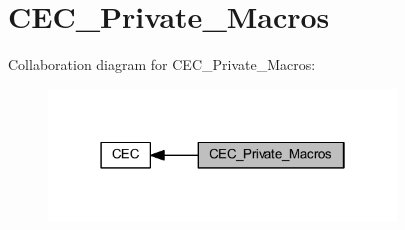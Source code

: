 \hypertarget{group___c_e_c___private___macros}{}\section{C\+E\+C\+\_\+\+Private\+\_\+\+Macros}
\label{group___c_e_c___private___macros}
Collaboration diagram for C\+E\+C\+\_\+\+Private\+\_\+\+Macros\+:
\nopagebreak
\begin{figure}[H]
\begin{center}
\leavevmode
\includegraphics[width=262pt]{group___c_e_c___private___macros}
\end{center}
\end{figure}
